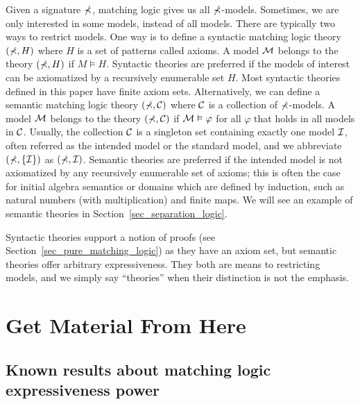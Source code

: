 \documentclass{amsart}
\begin{document}
Given a signature $\mathbb{\Sigma}$, matching logic gives us all $\mathbb{\Sigma}$-models.
Sometimes, we are only interested in some models, instead of all models.
There are typically two ways to restrict models.
One way is to define a syntactic matching logic theory
$(\mathbb{\Sigma}, H)$ where $H$ is a set of patterns called axioms.
A model $\mathcal{M}$ belongs to the theory $(\mathbb{\Sigma}, H)$ if $M \vDash H$.
Syntactic theories are preferred if the models of interest can be
axiomatized by a recursively enumerable set $H$.
Most syntactic theories defined in this paper have finite axiom sets.
Alternatively, we can define a semantic matching logic theory
$(\mathbb{\Sigma}, \mathcal{C})$ where $\mathcal{C}$ is a collection of $\mathbb{\Sigma}$-models.
A model $\mathcal{M}$ belongs to the theory $(\mathbb{\Sigma}, \mathcal{C})$ if
$\mathcal{M} \vDash \varphi$ for all $\varphi$ that holds in all models in $\mathcal{C}$.
Usually, the collection $\mathcal{C}$ is a singleton set containing exactly one model $\mathcal{I}$,
often referred as the intended model or the standard model,
and we abbreviate $(\mathbb{\Sigma}, \{ \mathcal{I} \})$ as $(\mathbb{\Sigma}, \mathcal{I})$.
Semantic theories are preferred if the intended model is not axiomatized by any
recursively enumerable set of axioms;
this is often the case for 
initial algebra semantics or domains which are defined by induction, such as
natural numbers (with multiplication) and finite maps.
We will see an example of semantic theories in Section~\ref{sec_separation_logic}.

Syntactic theories support a notion of proofs (see Section~\ref{sec_pure_matching_logic})
as they have an axiom set,
but semantic theories offer arbitrary expressiveness.
They both are means to restricting models,
and we simply say ``theories'' when their distinction is not the emphasis.



\section{Get Material From Here}

\subsection{Known results about matching logic expressiveness power}
\end{document}
